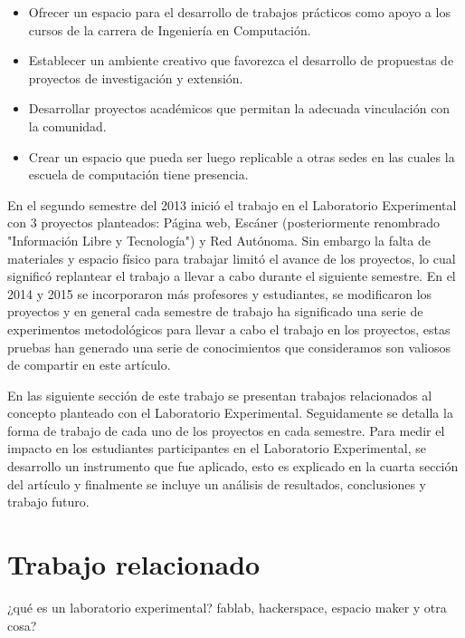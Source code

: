 \documentclass[conference]{IEEEtran}
\begin{document}
\begin{itemize}

\item Ofrecer un espacio para el desarrollo de trabajos prácticos como apoyo a los cursos de la carrera de Ingeniería en Computación.

\item Establecer un ambiente creativo que favorezca el desarrollo de propuestas de proyectos de investigación y extensión.

\item Desarrollar proyectos académicos que permitan la adecuada vinculación con la comunidad.

\item Crear un espacio que pueda ser luego replicable a otras sedes en las cuales la escuela de computación tiene presencia.

\end{itemize}


En el segundo semestre del 2013 inició el trabajo en el Laboratorio Experimental con 3 proyectos planteados: Página web, Escáner (posteriormente renombrado "Información Libre y Tecnología") y Red Autónoma. Sin embargo la falta de materiales y espacio físico para trabajar limitó el avance de los proyectos, lo cual significó replantear el trabajo a llevar a cabo durante el siguiente semestre. En el 2014 y 2015 se incorporaron más profesores y estudiantes, se modificaron los proyectos y en general cada semestre de trabajo ha significado una serie de experimentos metodológicos para llevar a cabo el trabajo en los proyectos, estas pruebas han generado una serie de conocimientos que consideramos son valiosos de compartir en este artículo. 

En las siguiente sección de este trabajo se presentan trabajos relacionados al concepto planteado con el Laboratorio Experimental. Seguidamente se detalla la forma de trabajo de cada uno de los proyectos en cada semestre. Para medir el impacto en los estudiantes participantes en el Laboratorio Experimental, se desarrollo un instrumento que fue aplicado, esto es explicado en la cuarta sección del artículo y finalmente se incluye un análisis de resultados, conclusiones y trabajo futuro. 


\section{Trabajo relacionado}


¿qué es un laboratorio experimental? fablab, hackerspace, espacio maker y otra cosa?
\end{document}
